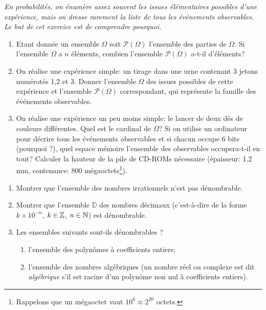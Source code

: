 \documentclass[a4paper,12pt,reqno]{amsart}
\begin{document}
\begin{exo} %

  \emph{En probabilités, on énumère assez souvent les issues élémentaires possibles d'une expérience, mais on dresse rarement la liste de tous les événements observables. Le but de cet exercice est de comprendre pourquoi.}

  \begin{enumerate}

    \item Etant donnée un ensemble $\Omega$ soit $\mathcal{P}(\Omega)$ l'ensemble des parties de $\Omega$. Si l'ensemble $\Omega$ a $n$ éléments, combien l'ensemble $\mathcal{P}(\Omega)$ a-t-il d'éléments?

    \item On réalise une expérience simple: un tirage dans une urne contenant 3 jetons numérotés 1,2 et 3.  Donner l'ensemble $\Omega$ des issues possibles de cette expérience et l'ensemble $\mathcal{P}(\Omega)$ correspondant, qui représente la famille des événements observables.

    \item On réalise une expérience un peu moins simple: le lancer de deux dés de couleurs différentes.  Quel est le cardinal de $\Omega$?  Si on utilise un ordinateur pour décrire tous les événements observables et si chacun occupe 6 bits (pourquoi ?), quel espace mémoire l'ensemble des observables occupera-t-il en tout?  Calculer la hauteur de la pile de CD-ROMs nécessaire (épaisseur: 1,2\,mm, contenance: 800 mégaoctets\footnote{Rappelons que un mégaoctet vaut $10^{6} \approx 2^{20}$ octets.}).
  \end{enumerate}
\end{exo}

\begin{exo} %

\begin{enumerate}
  \item Montrer que l'ensemble des nombres irrationnels  n'est pas dénombrable.
  \item Montrer que l'ensemble $\mathbb{D}$ des nombres décimaux (c'est-à-dire de la forme $k\times 10^{-n} $, $k\in\mathbb{Z}$, $n\in\mathbb{N}$) est dénombrable.

  \item Les ensembles suivants sont-ils dénombrables ?
  \begin{enumerate}
    \item l'ensemble des polynômes à coefficients entiers;
    \item l'ensemble des nombres algébriques (un nombre réel ou complexe est dit \emph{algébrique} s'il est racine d'un polynôme non nul à coefficients entiers).
  \end{enumerate}
\end{enumerate}

\end{exo}
\end{document}
